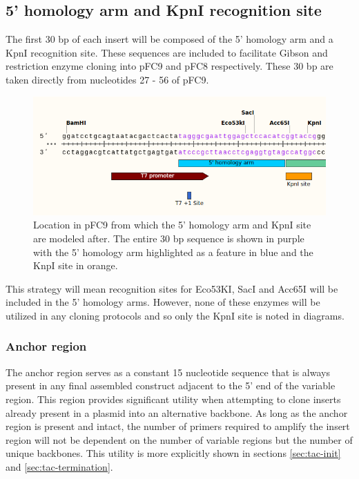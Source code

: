 \documentclass[11pt]{article}
\begin{document}
\subsection{5' homology arm and KpnI recognition site}

The first 30 bp of each insert will be composed of the 5' homology arm and a KpnI recognition site. These sequences are included to facilitate Gibson and restriction enzyme cloning into pFC9 and pFC8 respectively. These 30 bp are taken directly from nucleotides 27 - 56 of pFC9.

\begin{figure}[h]
	\includegraphics[width=12cm]{images/variable_region/5_homology_arm.png}
	\centering
	\caption{Location in pFC9 from which the 5' homology arm and KpnI site are modeled after. The entire 30 bp sequence is shown in purple with the 5' homology arm highlighted as a feature in blue and the KnpI site in orange.}
	\label{fig:homology_5}
\end{figure}

This strategy will mean recognition sites for Eco53KI, SacI and Acc65I will be included in the 5' homology arms. However, none of these enzymes will be utilized in any cloning protocols and so only the KpnI site is noted in diagrams.


\subsubsection{Anchor region}

The anchor region serves as a constant 15 nucleotide sequence that is always present in any final assembled construct adjacent to the 5' end of the variable region. This region provides significant utility when attempting to clone inserts already present in a plasmid into an alternative backbone. As long as the anchor region is present and intact, the number of primers required to amplify the insert region will not be dependent on the number of variable regions but the number of unique backbones. This utility is more explicitly shown in sections \ref{sec:tac-init} and \ref{sec:tac-termination}. 
\end{document}

